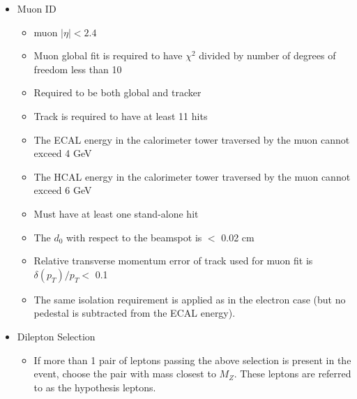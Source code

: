\begin{itemize}
\item Muon ID
  \begin{itemize}
  \item muon $|\eta| < 2.4$
  \item Muon global fit is required to have $\chi^2$ divided by number of degrees of freedom less than 10
  \item Required to be both global and tracker
  \item Track is required to have at least 11 hits
  \item The ECAL energy in the calorimeter tower traversed by the muon cannot exceed 4 GeV
  \item The HCAL energy in the calorimeter tower traversed by the muon cannot exceed 6 GeV
  \item Must have at least one stand-alone hit
  \item The $d_0$ with respect to the beamspot is $<$ 0.02 cm
  \item Relative transverse momentum error of track used for muon fit is  $\delta(p_{T})/p_{T} < $ 0.1
  \item The same isolation requirement is applied as in the electron case (but no pedestal is subtracted from the ECAL energy).
  \end{itemize}
\item Dilepton Selection
  \begin{itemize}
  \item If more than 1 pair of leptons passing the above selection is present in the event, choose the
    pair with mass closest to $M_{Z}$. These leptons are referred to as the \Z hypothesis leptons.
  \end{itemize}


\end{itemize}


